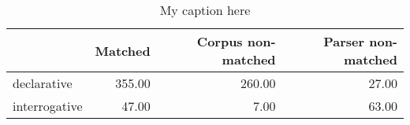 \begin{table}[!ht]
\centering
\begin{tabular}{lrrr}
\toprule
{} &  Matched &  Corpus non-matched &  Parser non-matched \\
\midrule
declarative   &   355.00 &              260.00 &               27.00 \\
interrogative &    47.00 &                7.00 &               63.00 \\
\bottomrule
\end{tabular}
\caption{My caption here}
\label{tab:INDICATIVE-ocd-data}
\end{table}